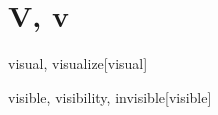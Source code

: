 \section{V, v}

\begin{word}{visual, visualize}[visual]
\end{word}

\begin{word}{visible, visibility, invisible}[visible]
\end{word}